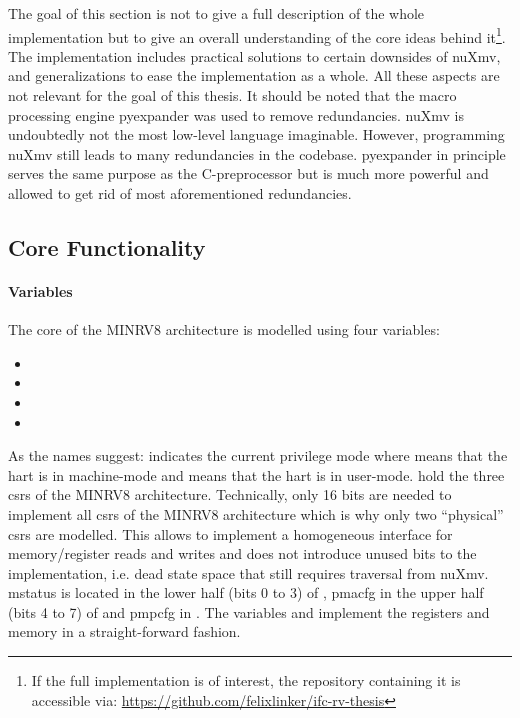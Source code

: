 The goal of this section is not to give a full description of the whole implementation but to give an overall understanding of the core ideas behind it\footnote{%
    If the full implementation is of interest, the repository containing it is accessible via: \url{https://github.com/felixlinker/ifc-rv-thesis}
}.
The implementation includes practical solutions to certain downsides of nuXmv, and generalizations to ease the implementation as a whole.
All these aspects are not relevant for the goal of this thesis.
It should be noted that the macro processing engine pyexpander \cite{pyexpander} was used to remove redundancies.
nuXmv is undoubtedly not the most low-level language imaginable.
However, programming nuXmv still leads to many redundancies in the codebase.
pyexpander in principle serves the same purpose as the C-preprocessor but is much more powerful and allowed to get rid of most aforementioned redundancies.

\subsection{Core Functionality}
\label{sec:implementation-core}

\paragraph{Variables}
The core of the MINRV8 architecture is modelled using four variables:
\begin{itemize}
    \item {}
    \item {}
    \item {}
    \item {}
\end{itemize}

As the names suggest:  indicates the current privilege mode where  means that the \gls{hart} is in machine-mode and  means that the \gls{hart} is in user-mode.
 hold the three \glspl{csr} of the MINRV8 architecture.
Technically, only 16 bits are needed to implement all \glspl{csr} of the MINRV8 architecture which is why only two \enquote{physical} \glspl{csr} are modelled.
This allows to implement a homogeneous interface for memory/register reads and writes and does not introduce unused bits to the implementation, i.e. dead state space that still requires traversal from nuXmv.
\gls{mstatus} is located in the lower half (bits 0 to 3) of , \gls{pmacfg} in the upper half (bits 4 to 7) of  and \gls{pmpcfg} in .
The variables  and  implement the registers and memory in a straight-forward fashion.

